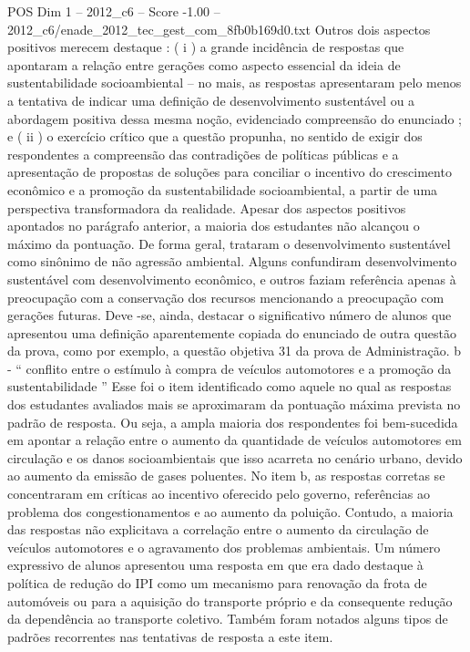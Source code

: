 \begin{textsample}{POS Dim 1 – 2012\_c6 – Score -1.00 – 2012\_c6/enade\_2012\_tec\_gest\_com\_8fb0b169d0.txt}
Outros dois aspectos positivos merecem destaque : ( i ) a grande incidência de respostas que apontaram a relação entre gerações como aspecto essencial da ideia de sustentabilidade socioambiental – no mais, as respostas apresentaram pelo menos a tentativa de indicar uma definição de desenvolvimento sustentável ou a abordagem positiva dessa mesma noção, evidenciado compreensão do enunciado ; e ( ii ) o exercício crítico que a questão propunha, no sentido de exigir dos respondentes a compreensão das contradições de políticas públicas e a apresentação de propostas de soluções para conciliar o incentivo do crescimento econômico e a promoção da sustentabilidade socioambiental, a partir de uma perspectiva transformadora da realidade.
Apesar dos aspectos positivos apontados no parágrafo anterior, a maioria dos estudantes não alcançou o máximo da pontuação.
De forma geral, trataram o desenvolvimento sustentável como sinônimo de não agressão ambiental.
Alguns confundiram desenvolvimento sustentável com desenvolvimento econômico, e outros faziam referência apenas à preocupação com a conservação dos recursos mencionando a preocupação com gerações futuras.
Deve -se, ainda, destacar o significativo número de alunos que apresentou uma definição aparentemente copiada do enunciado de outra questão da prova, como por exemplo, a questão objetiva 31 da prova de Administração. b - “ conflito entre o estímulo à compra de veículos automotores e a promoção da sustentabilidade ” Esse foi o item identificado como aquele no qual as respostas dos estudantes avaliados mais se aproximaram da pontuação máxima prevista no padrão de resposta.
Ou seja, a ampla maioria dos respondentes foi bem-sucedida em apontar a relação entre o aumento da quantidade de veículos automotores em circulação e os danos socioambientais que isso acarreta no cenário urbano, devido ao aumento da emissão de gases poluentes.
No item b, as respostas corretas se concentraram em críticas ao incentivo oferecido pelo governo, referências ao problema dos congestionamentos e ao aumento da poluição.
Contudo, a maioria das respostas não explicitava a correlação entre o aumento da circulação de veículos automotores e o agravamento dos problemas ambientais.
Um número expressivo de alunos apresentou uma resposta em que era dado destaque à política de redução do IPI como um mecanismo para renovação da frota de automóveis ou para a aquisição do transporte próprio e da consequente redução da dependência ao transporte coletivo.
Também foram notados alguns tipos de padrões recorrentes nas tentativas de resposta a este item.

\end{textsample}
